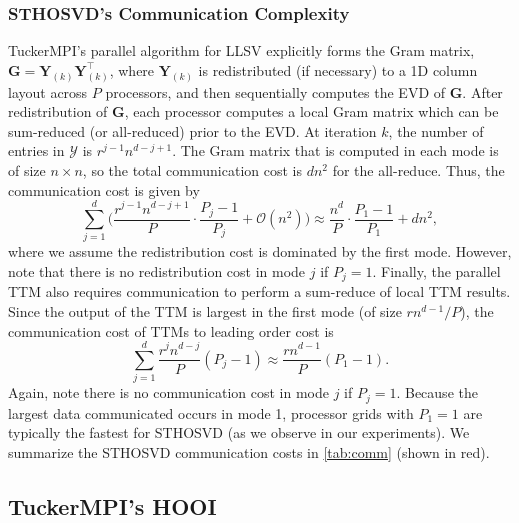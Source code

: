     \subsubsection{STHOSVD's Communication Complexity} \label{sec:STHOSVD's Communication Complexity}

        TuckerMPI's parallel algorithm for LLSV explicitly forms the Gram
        matrix, $\mathbf{G} = \mathbf{Y}_{(k)}\mathbf{Y}_{(k)}^\intercal$,
        where $\mathbf{Y}_{(k)}$ is redistributed (if necessary) to a 1D column
        layout across $P$ processors, and then sequentially computes the EVD of
        $\mathbf{G}$. After redistribution of $\mathbf{G}$, each processor
        computes a local Gram matrix which can be sum-reduced (or all-reduced)
        prior to the EVD. At iteration $k$, the number of entries in
        $\mathcal{Y}$ is $r^{j-1}n^{d-j+1}$. The Gram matrix that is computed in
        each mode is of size $n \times n$, so the total communication cost is
        $dn^2$ for the all-reduce. Thus, the communication cost is given by
        \begin{equation*}
            \sum_{j=1}^{d} \bigg(\frac{r^{j-1}n^{d-j+1}}{P}\cdot \frac{P_j - 1}{P_j} + \mathcal{O}(n^2)\bigg) \approx \frac{n^{d}}{P}\cdot \frac{P_1 - 1}{P_1} + dn^2,
        \end{equation*}
        where we assume the redistribution cost is dominated by the first mode. However,
        note that there is no redistribution cost in mode $j$ if $P_j=1$. Finally, the
        parallel TTM also requires communication to perform a sum-reduce of local TTM
        results. Since the output of the TTM is largest in the first mode (of size
        $rn^{d-1}/P$), the communication cost of TTMs to leading order cost is
        \begin{equation*}
            \sum_{j=1}^{d} \frac{r^{j}n^{d-j}}{P}(P_j - 1) \approx \frac{rn^{d-1}}{P}(P_1 - 1).
        \end{equation*}
        Again, note there is no communication cost in mode $j$ if $P_j=1$.
        Because the largest data communicated occurs in mode 1, processor grids
        with $P_1=1$ are typically the fastest for STHOSVD (as we observe in our
        experiments). We summarize the STHOSVD communication costs in
        \cref{tab:comm} (shown in red).

\subsection{TuckerMPI's HOOI} \label{sec:TuckerMPI's HOOI}
